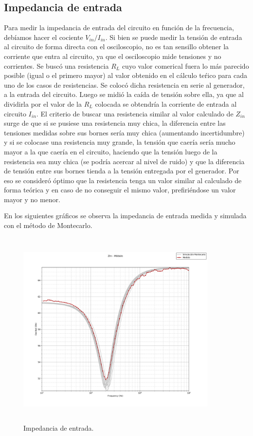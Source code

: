 \subsection{Impedancia de entrada}
Para medir la impedancia de entrada del circuito en funci\'on de la frecuencia, 
deb\'iamos hacer el cociente $V_{in}/I_{in}$. Si bien se puede medir la tensi\'on 
de entrada al circuito de forma directa con el osciloscopio, 
no es tan sensillo obtener la corriente que entra al circuito, ya que el osciloscopio 
mide tensiones y no corrientes. Se busc\'o una resistencia $R_L$ cuyo valor comerical 
fuera lo m\'as parecido posible (igual o el primero mayor) al valor obtenido en 
el c\'alculo te\'rico para cada uno de los casos de resistencias. Se coloc\'o dicha 
resistencia en serie al generador, a la entrada del circuito. Luego se midi\'o la ca\'ida 
de tensi\'on sobre ella, ya que al dividirla por el valor de la $R_L$ colocada se obtendr\'ia 
la corriente de entrada al circuito $I_{in}$. El criterio de buscar una resistencia similar 
al valor calculado de $Z_{in}$ surge de que si se pusiese una resistencia muy chica, 
la diferencia entre las tensiones medidas sobre sus bornes ser\'ia muy chica 
(aumentando incertidumbre) y si se colocase una resistencia muy grande, 
la tensi\'on que caer\'ia ser\'ia mucho mayor a la que caer\'ia en el circuito, 
haciendo que la tensi\'on luego de la resistencia sea muy chica (se podr\'ia 
acercar al nivel de ruido) y que la diferencia de tensi\'on entre sus bornes tienda 
a la tensi\'on entregada por el generador. Por eso se consider\'o \'optimo que la 
resistencia tenga un valor similar al calculado de forma te\'orica y en caso de no 
conseguir el mismo valor, prefiri\'endose un valor mayor y no menor. 


En los siguientes gr\'aficos se observa la impedancia de entrada medida y simulada con el m\'etodo de Montecarlo.
\begin{figure}[H] %
	\centering
	\includegraphics[width=10cm,height=10cm,keepaspectratio]{../EJ1/00GRAFICOS/zin_modulo_sinTeorico.png}
	\caption{Impedancia de entrada.}
	\label{zin_mod}
\end{figure}

